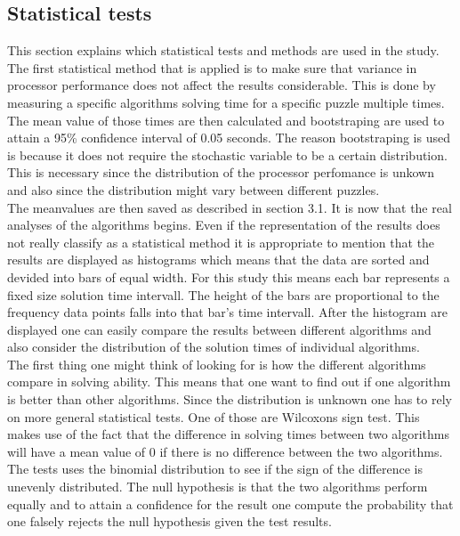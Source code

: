\documentclass[a4paper,11pt]{kth-mag}
\begin{document}
\FloatBarrier
\subsection{Statistical tests}
\label{sec:statisticalTests}
This section explains which statistical tests and methods are used in the study.
The first statistical method that is applied is to make sure that variance in processor performance does not affect the results considerable. 
This is done by measuring a specific algorithms solving time for a specific puzzle multiple times. 
The mean value of those times are then calculated and bootstraping are used to attain a 95\% confidence interval of 0.05 seconds. 
The reason bootstraping is used is because it does not require the stochastic variable to be a certain distribution. 
This is necessary since the distribution of the processor perfomance is unkown and also since the distribution might vary between different puzzles. \\
The meanvalues are then saved as described in section 3.1.
It is now that the real analyses of the algorithms begins. 
Even if the representation of the results does not really classify as a statistical method it is appropriate to mention that the results are displayed as histograms which means that the data are sorted and devided into bars of equal width. 
For this study this means each bar represents a fixed size solution time intervall. 
The height of the bars are proportional to the frequency data points falls into that bar's time intervall.
After the histogram are displayed one can easily compare the results between different algorithms and also consider the distribution of the solution times of individual algorithms.\\
The first thing one might think of looking for is how the different algorithms compare in solving ability. 
This means that one want to find out if one algorithm is better than other algorithms. 
Since the distribution is unknown one has to rely on more general statistical tests. 
One of those are Wilcoxons sign test. 
This makes use of the fact that the difference in solving times between two algorithms will have a mean value of 0 if there is no difference between the two algorithms. 
The tests uses the binomial distribution to see if the sign of the difference is unevenly distributed.
The null hypothesis is that the two algorithms perform equally and to attain a confidence for the result one compute the probability that one falsely rejects the null hypothesis given the test results.
\\
\end{document}
